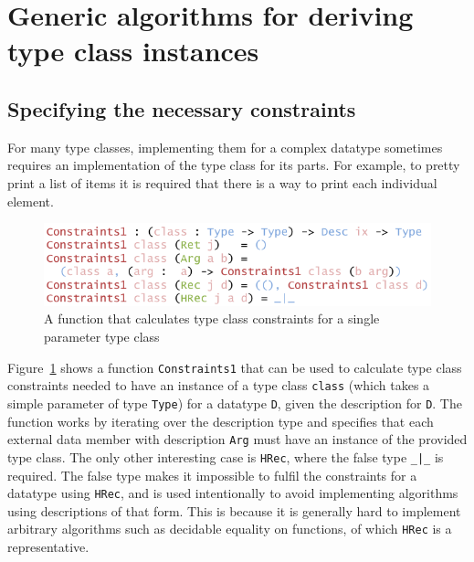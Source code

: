 \documentclass{ituthesis}
\newcommand{\ttconstructor}[1]{\textcolor{constructor-color}{\texttt{#1}}}
\newcommand{\tttype}[1]{\textcolor{type-color}{\texttt{#1}}}
\newcommand{\ttdec}[1]{\textcolor{declared-var-color}{\texttt{#1}}}
\newcommand{\ttvar}[1]{\textcolor{local-var-color}{\texttt{#1}}}
\theoremstyle{break}
\begin{document}
\section{Generic algorithms for deriving type class instances}
\label{sec:Genericalgorithmsforderivingtypeclassinstances}

\subsection{Specifying the necessary constraints}
\label{sub:Specifying the necessary constraints}

For many type classes, implementing them for a complex datatype sometimes requires an implementation of the type class for its parts.
For example, to pretty print a list of items it is required that there is a way to print each individual element.

\begin{figure}[ht]
\begin{center}
    \includegraphics[scale=0.5]{Figures/ConstrainingTypeclasses.png}
\end{center}
\caption{A function that calculates type class constraints for a single parameter type class}
\label{fig:constrclass}
\end{figure}

Figure~\ref{fig:constrclass} shows a function \ttdec{Constraints1} that can be used to calculate type class constraints needed to have an instance of a type class \ttvar{class} (which takes a simple parameter of type \tttype{Type}) for a datatype \tttype{D}, given the description for \tttype{D}.
The function works by iterating over the description type and specifies that each external data member with description \ttconstructor{Arg}
must have an instance of the provided type class.
The only other interesting case is \ttconstructor{HRec}, where the false type \tttype{\_|\_} is required.
The false type makes it impossible to fulfil the constraints for a datatype using \ttconstructor{HRec}, and is used intentionally to avoid implementing algorithms using descriptions of that form.
This is because it is generally hard to implement arbitrary algorithms such as decidable equality on functions, of which \ttconstructor{HRec} is a representative.
\end{document}
